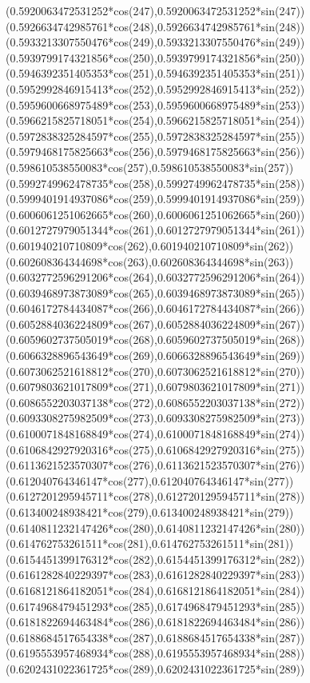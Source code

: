 {({0.5920063472531252*cos(247)},{0.5920063472531252*sin(247)})
({0.5926634742985761*cos(248)},{0.5926634742985761*sin(248)})
({0.5933213307550476*cos(249)},{0.5933213307550476*sin(249)})
({0.5939799174321856*cos(250)},{0.5939799174321856*sin(250)})
({0.5946392351405353*cos(251)},{0.5946392351405353*sin(251)})
({0.5952992846915413*cos(252)},{0.5952992846915413*sin(252)})
({0.5959600668975489*cos(253)},{0.5959600668975489*sin(253)})
({0.5966215825718051*cos(254)},{0.5966215825718051*sin(254)})
({0.5972838325284597*cos(255)},{0.5972838325284597*sin(255)})
({0.5979468175825663*cos(256)},{0.5979468175825663*sin(256)})
({0.598610538550083*cos(257)},{0.598610538550083*sin(257)})
({0.5992749962478735*cos(258)},{0.5992749962478735*sin(258)})
({0.5999401914937086*cos(259)},{0.5999401914937086*sin(259)})
({0.6006061251062665*cos(260)},{0.6006061251062665*sin(260)})
({0.6012727979051344*cos(261)},{0.6012727979051344*sin(261)})
({0.601940210710809*cos(262)},{0.601940210710809*sin(262)})
({0.602608364344698*cos(263)},{0.602608364344698*sin(263)})
({0.6032772596291206*cos(264)},{0.6032772596291206*sin(264)})
({0.6039468973873089*cos(265)},{0.6039468973873089*sin(265)})
({0.6046172784434087*cos(266)},{0.6046172784434087*sin(266)})
({0.6052884036224809*cos(267)},{0.6052884036224809*sin(267)})
({0.6059602737505019*cos(268)},{0.6059602737505019*sin(268)})
({0.6066328896543649*cos(269)},{0.6066328896543649*sin(269)})
({0.6073062521618812*cos(270)},{0.6073062521618812*sin(270)})
({0.6079803621017809*cos(271)},{0.6079803621017809*sin(271)})
({0.6086552203037138*cos(272)},{0.6086552203037138*sin(272)})
({0.6093308275982509*cos(273)},{0.6093308275982509*sin(273)})
({0.6100071848168849*cos(274)},{0.6100071848168849*sin(274)})
({0.6106842927920316*cos(275)},{0.6106842927920316*sin(275)})
({0.6113621523570307*cos(276)},{0.6113621523570307*sin(276)})
({0.612040764346147*cos(277)},{0.612040764346147*sin(277)})
({0.6127201295945711*cos(278)},{0.6127201295945711*sin(278)})
({0.613400248938421*cos(279)},{0.613400248938421*sin(279)})
({0.6140811232147426*cos(280)},{0.6140811232147426*sin(280)})
({0.614762753261511*cos(281)},{0.614762753261511*sin(281)})
({0.6154451399176312*cos(282)},{0.6154451399176312*sin(282)})
({0.6161282840229397*cos(283)},{0.6161282840229397*sin(283)})
({0.6168121864182051*cos(284)},{0.6168121864182051*sin(284)})
({0.6174968479451293*cos(285)},{0.6174968479451293*sin(285)})
({0.6181822694463484*cos(286)},{0.6181822694463484*sin(286)})
({0.6188684517654338*cos(287)},{0.6188684517654338*sin(287)})
({0.6195553957468934*cos(288)},{0.6195553957468934*sin(288)})
({0.6202431022361725*cos(289)},{0.6202431022361725*sin(289)})
}
